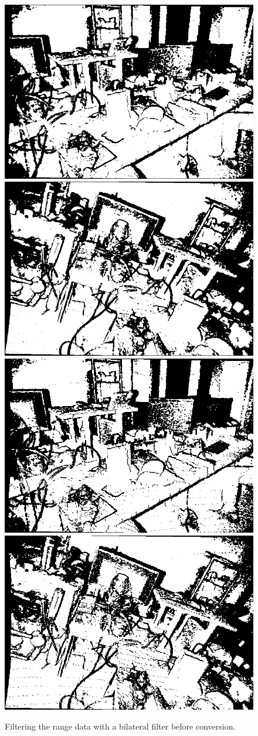 \begin{figure}[H]
    \includegraphics[width=0.25\linewidth]{chapter06/results/conv_images/office/flexion/bl/0014.png}%
    \includegraphics[width=0.25\linewidth]{chapter06/results/conv_images/office/flexion/bl/0028.png}%
    \includegraphics[width=0.25\linewidth]{chapter06/results/conv_images/office/bearing/bl/0014.png}%
    \includegraphics[width=0.25\linewidth]{chapter06/results/conv_images/office/bearing/bl/0028.png}%
    \caption{Filtering the range data with a bilateral filter before conversion.}
\end{figure}

